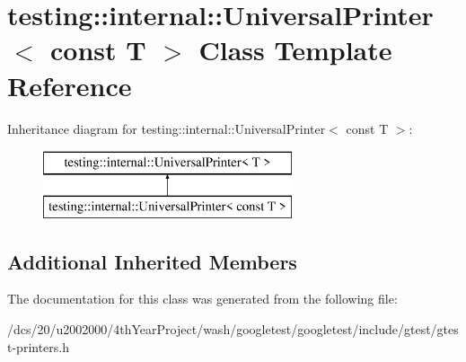 \hypertarget{classtesting_1_1internal_1_1UniversalPrinter_3_01const_01T_01_4}{}\section{testing\+:\+:internal\+:\+:Universal\+Printer$<$ const T $>$ Class Template Reference}
\label{classtesting_1_1internal_1_1UniversalPrinter_3_01const_01T_01_4}
Inheritance diagram for testing\+:\+:internal\+:\+:Universal\+Printer$<$ const T $>$\+:\begin{figure}[H]
\begin{center}
\leavevmode
\includegraphics[height=2.000000cm]{classtesting_1_1internal_1_1UniversalPrinter_3_01const_01T_01_4}
\end{center}
\end{figure}
\subsection*{Additional Inherited Members}


The documentation for this class was generated from the following file\+:\begin{DoxyCompactItemize}
\item 
/dcs/20/u2002000/4th\+Year\+Project/wash/googletest/googletest/include/gtest/gtest-\/printers.\+h\end{DoxyCompactItemize}
